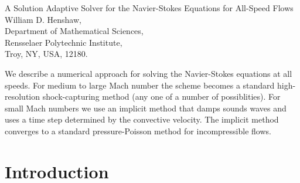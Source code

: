 \documentclass[10pt]{article}
\begin{document}
\def\R      {{\bf R}}
\def\Dv     {{\bf D}}
\def\bv     {{\bf b}}
\def\dv     {{\bf d}}
\def\fv     {{\bf f}}
\def\Fv     {{\bf F}}
\def\gv     {{\bf g}}
\def\Gv     {{\bf G}}
\newcommand{\lv}{{\bf l}}
\newcommand{\ev}{{\bf e}}
\newcommand{\hv}{{\bf h}}
\def\Hv     {{\bf H}}
\def\iv     {{\bf i}}
\def\jv     {{\bf j}}
\def\Jv     {{\bf J}}
\def\kv     {{\bf k}}
\def\nv     {{\bf n}}
\def\Pv     {{\bf P}}
\def\rv     {{\bf r}}
\def\tv     {{\bf t}}
\def\uv     {{\bf u}}
\def\Uv     {{\bf U}}
\def\Rv     {{\bf R}}
\def\vv     {{\bf v}}
\def\Vv     {{\bf V}}
\def\xv     {{\bf x}}
\def\yv     {{\bf y}}
\def\zv     {{\bf z}}
\def\lt     {{<}}
\def\grad    {\nabla}
\def\comma  {~~~,~~}
\def\uvd    {{\bf U}}
\def\ud     {{    U}}
\def\pd     {{    P}}
\def\calo{{\cal O}}

\newcommand{\mbar}{\bar{m}}
\newcommand{\Rbar}{\bar{R}}
\newcommand{\Ru}{R_u}         %
\newcommand{\Iv}{{\bf I}}
\newcommand{\qv}{{\bf q}}
\newcommand{\Div}{\grad\cdot}
\newcommand{\tauv}{{\bf \tau}}
\newcommand{\sumi}{\sum_{i=1}^n}
\newcommand{\half}{{1\over2}}
\newcommand{\dt}{{\Delta t}}

\def\ff {\tt} %

\baselineskip
\begin{flushleft}
{ \Large A Solution Adaptive Solver for the Navier-Stokes Equations for All-Speed Flows 
}
\baselineskip
William D. Henshaw,\\
Department of Mathematical Sciences, \\
Rensselaer Polytechnic Institute, \\
Troy, NY, USA, 12180.
 
\baselineskip

We describe a numerical approach for solving the Navier-Stokes equations
at all speeds. For medium to large Mach number the scheme becomes a
standard high-resolution shock-capturing method (any one of a number
of possiblities). For small Mach numbers we use an implicit method that
damps sounds waves and uses a time step determined by the convective
velocity. The implicit method converges to a standard pressure-Poisson
method for incompressible flows.


\end{flushleft}

\tableofcontents

\section{Introduction}
\end{document}
